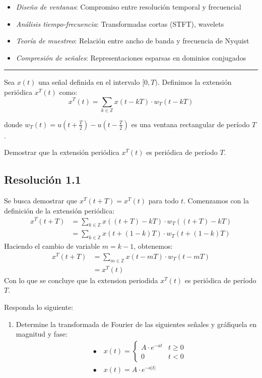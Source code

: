 \documentclass[
  11pt,
  letterpaper,
   addpoints,
   answers
  ]{exam}
\begin{document}
\begin{itemize}
\item \textit{Diseño de ventanas}: Compromiso entre resolución temporal y frecuencial
\item \textit{Análisis tiempo-frecuencia}: Transformadas cortas (STFT), wavelets
\item \textit{Teoría de muestreo}: Relación entre ancho de banda y frecuencia de Nyquist
\item \textit{Compresión de señales}: Representaciones esparsas en dominios conjugados
\end{itemize}
\noindent\rule{\textwidth}{0.4pt}
\newpage
\begin{questions}

\question Sea $x(t)$ una señal definida en el intervalo $[0, T)$. Definimos la extensión periódica $x^T(t)$ como:
\begin{equation}
x^T(t) = \sum_{k \in \mathbb{Z}} x(t - kT) \cdot w_T(t - kT)
\end{equation}

donde $w_T(t) = u(t + \frac{T}{2}) - u(t - \frac{T}{2})$ es una ventana rectangular de período $T$.

Demostrar que la extensión periódica $x^T(t)$ es periódica de período $T$.
\begin{solution}
  \subsection*{Resolución 1.1}
  Se busca demostrar que $x^T(t + T) = x^T(t)$ para todo $t$. Comenzamos con la definición de la extensión periódica:
  \begin{align*}
    x^T(t + T) &= \sum_{k \in \mathbb{Z}} x((t + T) - kT) \cdot w_T((t + T) - kT) \\
               &= \sum_{k \in \mathbb{Z}} x(t + (1 - k)T) \cdot w_T(t + (1 - k)T)
  \end{align*}
  Haciendo el cambio de variable \(m = k - 1\), obtenemos:
  \begin{align*}
    x^T(t + T) &= \sum_{m \in \mathbb{Z}} x(t - mT) \cdot w_T(t - mT) \\
               &= x^T(t)
  \end{align*}
Con lo que se concluye que la extension periodida $x^T(t)$ es periódica de período $T$.
\end{solution}
\question Responda lo siguiente:
\begin{enumerate}
  \item Determine la transformada de Fourier de las siguientes señales y gráfiquela en magnitud y fase:
\begin{align*}
  &\bullet\quad x(t) = \begin{cases}
    A \cdot e^{-a t} & t \geq 0 \\
    0 & t < 0
  \end{cases} \\
  &\bullet\quad x(t) = A \cdot e^{-a|t|}
\end{align*}


\end{enumerate}
\end{questions}
\end{document}
